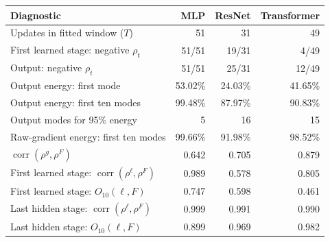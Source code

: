 \begin{tabular}{@{}lrrr@{}}
\toprule
Diagnostic & MLP & ResNet & Transformer \\
\midrule
Updates in fitted window ($T$) & 51 & 31 & 49 \\
First learned stage: negative $\rho_t$ & 51/51 & 19/31 & 4/49 \\
Output: negative $\rho_t$ & 51/51 & 25/31 & 12/49 \\
\midrule
Output energy: first mode & 53.02\% & 24.03\% & 41.65\% \\
Output energy: first ten modes & 99.48\% & 87.97\% & 90.83\% \\
Output modes for 95\% energy & 5 & 16 & 15 \\
Raw-gradient energy: first ten modes & 99.66\% & 91.98\% & 98.52\% \\
\midrule
$\operatorname{corr}(\rho^g,\rho^F)$ & 0.642 & 0.705 & 0.879 \\
First learned stage: $\operatorname{corr}(\rho^\ell,\rho^F)$ & 0.989 & 0.578 & 0.805 \\
First learned stage: $O_{10}(\ell,F)$ & 0.747 & 0.598 & 0.461 \\
Last hidden stage: $\operatorname{corr}(\rho^\ell,\rho^F)$ & 0.999 & 0.991 & 0.990 \\
Last hidden stage: $O_{10}(\ell,F)$ & 0.899 & 0.969 & 0.982 \\
\bottomrule
\end{tabular}
